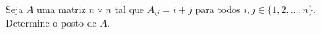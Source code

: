 Seja \(A\) uma matriz \(n\times n\) tal que \(A_{ij} = i+j\) para todos \(i, j \in \{1, 2, \ldots, n\}\).
Determine o posto de \(A\).
